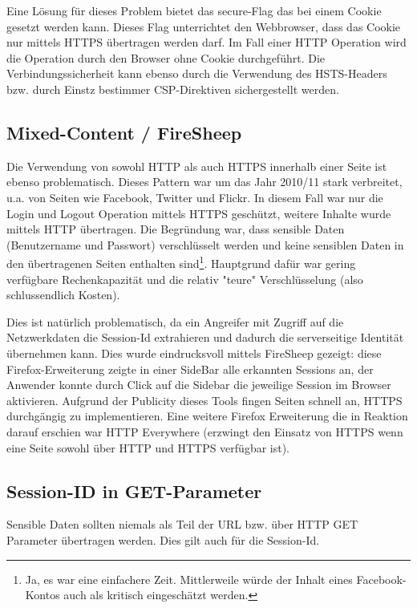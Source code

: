 Eine Lösung für dieses Problem bietet das secure-Flag das bei einem Cookie gesetzt werden kann. Dieses Flag unterrichtet den Webbrowser, dass das Cookie nur mittels HTTPS übertragen werden darf. Im Fall einer HTTP Operation wird die Operation durch den Browser ohne Cookie durchgeführt.  Die Verbindungssicherheit kann ebenso durch die Verwendung des HSTS-Headers bzw. durch Einstz bestimmer CSP-Direktiven sichergestellt werden.

\subsection{Mixed-Content / FireSheep}

Die Verwendung von sowohl HTTP als auch HTTPS innerhalb einer Seite ist ebenso problematisch. Dieses Pattern war um das Jahr 2010/11 stark verbreitet, u.a. von Seiten wie Facebook, Twitter und Flickr. In diesem Fall war nur die Login und Logout Operation mittels HTTPS geschützt, weitere Inhalte wurde mittels HTTP übertragen. Die Begründung war, dass sensible Daten (Benutzername und Passwort) verschlüsselt werden und keine sensiblen Daten in den übertragenen Seiten enthalten sind\footnote{Ja, es war eine einfachere Zeit. Mittlerweile würde der Inhalt eines Facebook-Kontos auch als kritisch eingeschätzt werden.}. Hauptgrund dafür war gering verfügbare Rechenkapazität und die relativ "teure" Verschlüsselung (also schlussendlich Kosten).

Dies ist natürlich problematisch, da ein Angreifer mit Zugriff auf die Netzwerkdaten die Session-Id extrahieren und dadurch die serverseitige Identität übernehmen kann. Dies wurde eindrucksvoll mittels FireSheep gezeigt: diese Firefox-Erweiterung zeigte in einer SideBar alle erkannten Sessions an, der Anwender konnte durch Click auf die Sidebar die jeweilige Session im Browser aktivieren. Aufgrund der Publicity dieses Tools fingen Seiten schnell an, HTTPS durchgängig zu implementieren. Eine weitere Firefox Erweiterung die in Reaktion darauf erschien war HTTP Everywhere (erzwingt den Einsatz von HTTPS wenn eine Seite sowohl über HTTP und HTTPS verfügbar ist).


\subsection{Session-ID in GET-Parameter}

Sensible Daten sollten niemals als Teil der URL bzw. über HTTP GET Parameter übertragen werden. Dies gilt auch für die Session-Id.

